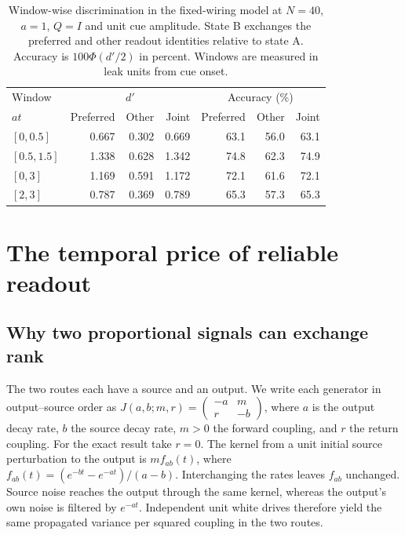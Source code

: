 \documentclass[aps,10pt,onecolumn,superscriptaddress,nofootinbib,
  longbibliography,amsmath,amssymb,floatfix]{revtex4-2}
\begin{document}
\begin{table}[ht]
\caption{\label{tab:window}Window-wise discrimination in the
fixed-wiring model at \(N=40\), \(a=1\), \(Q=I\) and unit cue amplitude. State B exchanges
the preferred and other readout identities relative to state A.
Accuracy is \(100\Phi(d'/2)\) in percent. Windows are measured in leak
units from cue onset.}
\begin{ruledtabular}
\begin{tabular}{lrrrrrr}
Window & \multicolumn{3}{c}{\(d'\)} &
          \multicolumn{3}{c}{Accuracy (\%)}\\
 \(at\) & Preferred & Other & Joint & Preferred & Other & Joint\\
\hline
\([0,0.5]\) & 0.667 & 0.302 & 0.669 & 63.1 & 56.0 & 63.1\\
\([0.5,1.5]\) & 1.338 & 0.628 & 1.342 & 74.8 & 62.3 & 74.9\\
\([0,3]\) & 1.169 & 0.591 & 1.172 & 72.1 & 61.6 & 72.1\\
\([2,3]\) & 0.787 & 0.369 & 0.789 & 65.3 & 57.3 & 65.3\\
\end{tabular}
\end{ruledtabular}
\end{table}

\section{The temporal price of reliable readout}
\label{sec:crosssupp}

\subsection{Why two proportional signals can exchange rank}

The two routes each have a source and an output. We write each
generator in output--source order as
\(J(a,b;m,r)=
\left(\begin{smallmatrix}-a&m\\r&-b\end{smallmatrix}\right)\),
where \(a\) is the output decay rate, \(b\) the source decay rate,
\(m>0\) the forward coupling, and \(r\) the return coupling.
For the exact result take \(r=0\). The kernel from a unit
initial source perturbation to the output is \(m f_{ab}(t)\),
where \(f_{ab}(t)=(e^{-bt}-e^{-at})/(a-b)\). Interchanging
the rates leaves \(f_{ab}\) unchanged. Source noise reaches
the output through the same kernel, whereas the output's own
noise is filtered by \(e^{-at}\). Independent unit white
drives therefore yield the same propagated variance per
squared coupling in the two routes.
\end{document}
